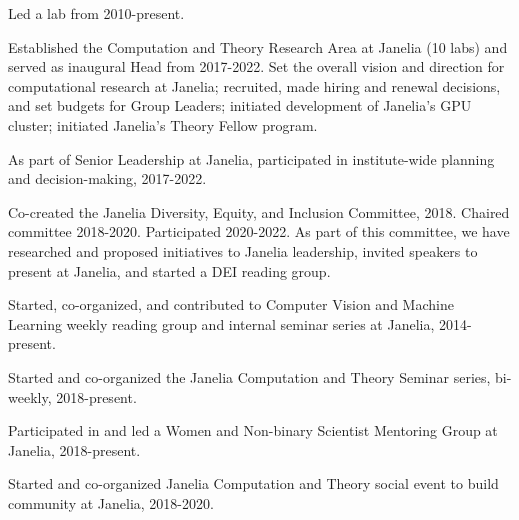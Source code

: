 \documentclass[11pt, letterpaper]{awesome-cv}
\begin{document}
\vspace{\acvSectionContentTopSkip}
\vspace{2mm}
\begin{cvitems}
\item Led a lab from 2010-present.
\item Established the Computation and Theory Research Area at Janelia (10 labs) and served as inaugural Head from 2017-2022. Set the overall vision and direction for computational research at Janelia; recruited, made hiring and renewal decisions, and set budgets for Group Leaders; initiated development of Janelia's GPU cluster; initiated Janelia's Theory Fellow program. 
\item As part of Senior Leadership at Janelia, participated in institute-wide planning and decision-making, 2017-2022.
\item Co-created the Janelia Diversity, Equity, and Inclusion Committee, 2018. Chaired committee 2018-2020. Participated 2020-2022. As part of this committee, we have researched and proposed initiatives to Janelia leadership, invited speakers to present at Janelia, and started a DEI reading group.
\item Started, co-organized, and contributed to Computer Vision and Machine Learning weekly reading group and internal seminar series at Janelia, 2014-present.
\item Started and co-organized the Janelia Computation and Theory Seminar series, bi-weekly, 2018-present. 
\item Participated in and led a Women and Non-binary Scientist Mentoring Group at Janelia, 2018-present.
\item Started and co-organized Janelia Computation and Theory social event to build community at Janelia, 2018-2020. 
\end{cvitems}
\vspace{\acvSectionContentTopSkip}

\vspace{\acvSectionContentTopSkip}
\vspace{2mm}
\end{document}
